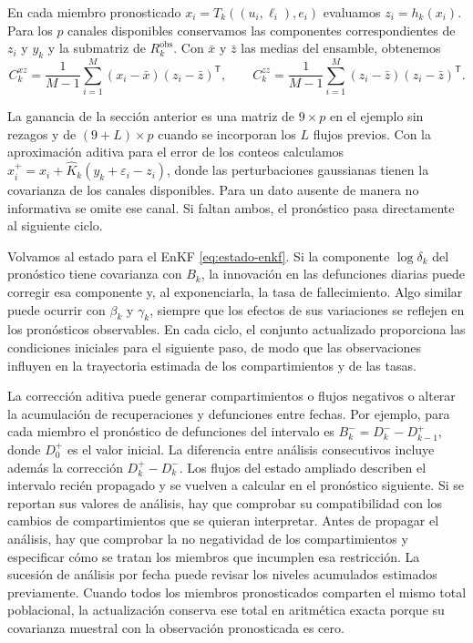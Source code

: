 En cada miembro pronosticado $x_i=T_k((u_i,\ell_i),e_i)$ evaluamos $z_i=h_k(x_i)$. Para los $p$ canales disponibles conservamos las componentes correspondientes de $z_i$ y $y_k$ y la submatriz de $R_k^{\mathrm{obs}}$. Con $\bar x$ y $\bar z$ las medias del ensamble, obtenemos
\[
 C_k^{xz}=\frac{1}{M-1}\sum_{i=1}^M(x_i-\bar x)(z_i-\bar z)^{\mathsf T},
 \qquad C_k^{zz}=\frac{1}{M-1}\sum_{i=1}^M(z_i-\bar z)(z_i-\bar z)^{\mathsf T}.
\]

La ganancia de la sección anterior es una matriz de $9\times p$ en el ejemplo sin rezagos y de $(9+L)\times p$ cuando se incorporan los $L$ flujos previos. Con la aproximación aditiva para el error de los conteos calculamos $x_i^+=x_i+\widehat K_k(y_k+\varepsilon_i-z_i)$, donde las perturbaciones gaussianas tienen la covarianza de los canales disponibles. Para un dato ausente de manera no informativa se omite ese canal. Si faltan ambos, el pronóstico pasa directamente al siguiente ciclo.

Volvamos al estado para el EnKF \eqref{eq:estado-enkf}. Si la componente $\log\delta_k$ del pronóstico tiene covarianza con $B_k$, la innovación en las defunciones diarias puede corregir esa componente y, al exponenciarla, la tasa de fallecimiento. Algo similar puede ocurrir con $\beta_k$ y $\gamma_k$, siempre que los efectos de sus variaciones se reflejen en los pronósticos observables. En cada ciclo, el conjunto actualizado proporciona las condiciones iniciales para el siguiente paso, de modo que las observaciones influyen en la trayectoria estimada de los compartimientos y de las tasas.


La corrección aditiva puede generar compartimientos o flujos negativos o alterar la acumulación de recuperaciones y defunciones entre fechas. Por ejemplo, para cada miembro el pronóstico de defunciones del intervalo es $B_k^-=D_k^- - D_{k-1}^+$, donde $D_0^+$ es el valor inicial. La diferencia entre análisis consecutivos incluye además la corrección $D_k^+-D_k^-$. Los flujos del estado ampliado describen el intervalo recién propagado y se vuelven a calcular en el pronóstico siguiente. Si se reportan sus valores de análisis, hay que comprobar su compatibilidad con los cambios de compartimientos que se quieran interpretar. Antes de propagar el análisis, hay que comprobar la no negatividad de los compartimientos y especificar cómo se tratan los miembros que incumplen esa restricción. La sucesión de análisis por fecha puede revisar los niveles acumulados estimados previamente. Cuando todos los miembros pronosticados comparten el mismo total poblacional, la actualización conserva ese total en aritmética exacta porque su covarianza muestral con la observación pronosticada es cero.

